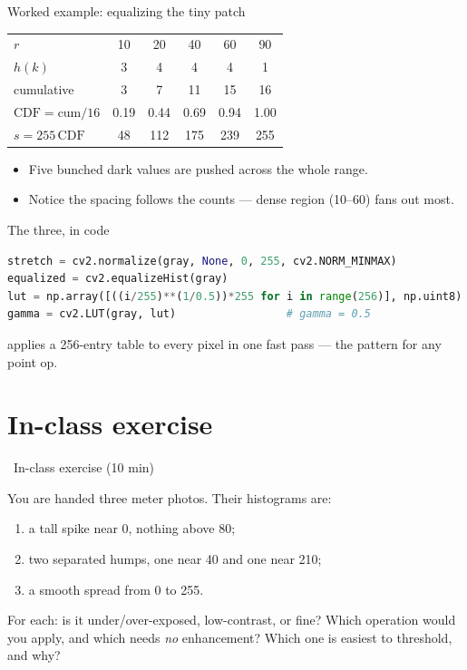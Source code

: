 \documentclass[10pt,aspectratio=169]{beamer}
\begin{document}
\begin{frame}{Worked example: equalizing the tiny patch}
  \begin{center}\footnotesize
  \begin{tabular}{lccccc}
    \toprule
    $r$ & 10 & 20 & 40 & 60 & 90 \\
    $h(k)$ & 3 & 4 & 4 & 4 & 1 \\
    cumulative & 3 & 7 & 11 & 15 & 16 \\
    $\mathrm{CDF}=\text{cum}/16$ & 0.19 & 0.44 & 0.69 & 0.94 & 1.00 \\
    $s=255\,\mathrm{CDF}$ & 48 & 112 & 175 & 239 & 255 \\
    \bottomrule
  \end{tabular}
  \end{center}
  \begin{itemize}
    \item Five bunched dark values are pushed across the whole range.
    \item Notice the spacing follows the counts — dense region (10--60) fans out most.
  \end{itemize}
\end{frame}

\begin{frame}[fragile]{The three, in code}
\begin{lstlisting}[language=Python]
stretch = cv2.normalize(gray, None, 0, 255, cv2.NORM_MINMAX)
equalized = cv2.equalizeHist(gray)
lut = np.array([((i/255)**(1/0.5))*255 for i in range(256)], np.uint8)
gamma = cv2.LUT(gray, lut)                 # gamma = 0.5
\end{lstlisting}
  \begin{infobox}
     applies a 256-entry table to every pixel in one fast pass — the pattern for any point op.
  \end{infobox}
\end{frame}

\section{In-class exercise}

\begin{frame}{\faPen~In-class exercise (10 min)}
  \begin{infobox}
  \end{infobox}
  You are handed three meter photos. Their histograms are:
  \begin{enumerate}
    \item a tall spike near 0, nothing above 80;
    \item two separated humps, one near 40 and one near 210;
    \item a smooth spread from 0 to 255.
  \end{enumerate}
  For each: is it under/over-exposed, low-contrast, or fine? Which operation would you apply,
  and which needs \emph{no} enhancement? Which one is easiest to threshold, and why?
\end{frame}
\end{document}
